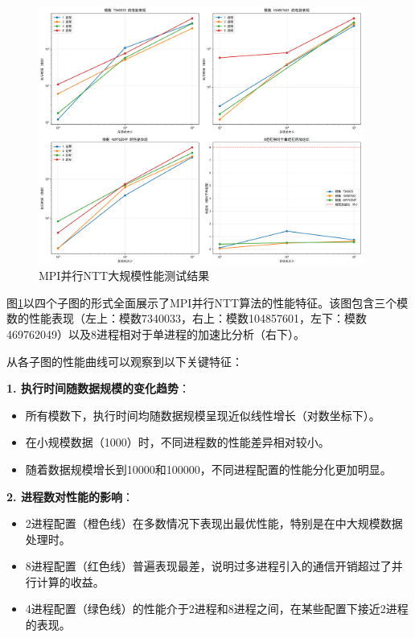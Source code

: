 \documentclass[a4paper]{article}
\begin{document}
\begin{figure}[H]
    \centering
    \includegraphics[width=0.95\textwidth]{fig/mpi_performance.png}
    \caption{MPI并行NTT大规模性能测试结果}
    \label{fig:mpi_performance}
\end{figure}

图\ref{fig:mpi_performance}以四个子图的形式全面展示了MPI并行NTT算法的性能特征。该图包含三个模数的性能表现（左上：模数7340033，右上：模数104857601，左下：模数469762049）以及8进程相对于单进程的加速比分析（右下）。

从各子图的性能曲线可以观察到以下关键特征：

\textbf{1. 执行时间随数据规模的变化趋势}：
\begin{itemize}
  \item 所有模数下，执行时间均随数据规模呈现近似线性增长（对数坐标下）。
  \item 在小规模数据（1000）时，不同进程数的性能差异相对较小。
  \item 随着数据规模增长到10000和100000，不同进程配置的性能分化更加明显。
\end{itemize}

\textbf{2. 进程数对性能的影响}：
\begin{itemize}
  \item 2进程配置（橙色线）在多数情况下表现出最优性能，特别是在中大规模数据处理时。
  \item 8进程配置（红色线）普遍表现最差，说明过多进程引入的通信开销超过了并行计算的收益。
  \item 4进程配置（绿色线）的性能介于2进程和8进程之间，在某些配置下接近2进程的表现。
\end{itemize}
\end{document}
